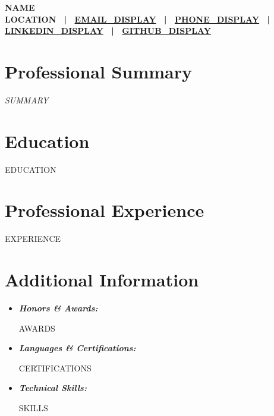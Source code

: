 \documentclass[a4paper,10pt]{article}
\newcommand{\resumeSubHeadingListStart}{\begin{itemize}[leftmargin=0.0in, label={}]}
\newcommand{\resumeSubHeadingListEnd}{\end{itemize}}
\begin{document}
    \begin{center}
        {\Large\bfseries\color{namepurple} {{NAME}}}
        \\ \vspace{2pt}
        \small\textbf{
        {{LOCATION}} ~|~
        \href{mailto:{{EMAIL_URL}}}{{{EMAIL_DISPLAY}}} ~|~
        \href{tel:{{PHONE_URL}}}{{{PHONE_DISPLAY}}} ~|~
        \href{{{LINKEDIN_URL}}}{{{LINKEDIN_DISPLAY}}} ~|~
        \href{{{GITHUB_URL}}}{{{GITHUB_DISPLAY}}}
        }
    \end{center}
    \vspace{-8pt}

\section{Professional Summary}
\small\textit{{{SUMMARY}}}

\section{Education}
  \resumeSubHeadingListStart
{{EDUCATION}}
  \resumeSubHeadingListEnd

\section{Professional Experience}
  \resumeSubHeadingListStart
{{EXPERIENCE}}
  \resumeSubHeadingListEnd

\section{Additional Information}
\vspace{-2pt}
\begin{itemize}[leftmargin=0.15in, label={}, itemsep=0pt, topsep=2pt]
  \small
  \item \textbf{\textit{Honors \& Awards:}}
  \begin{itemize}[itemsep=0pt, topsep=1pt]
{{AWARDS}}
  \end{itemize}
  \item \textbf{\textit{Languages \& Certifications:}}
  \begin{itemize}[itemsep=0pt, topsep=1pt]
{{CERTIFICATIONS}}
  \end{itemize}
  \item \textbf{\textit{Technical Skills:}}
  \begin{itemize}[itemsep=0pt, topsep=1pt]
{{SKILLS}}
  \end{itemize}
\end{itemize}
\end{document}
